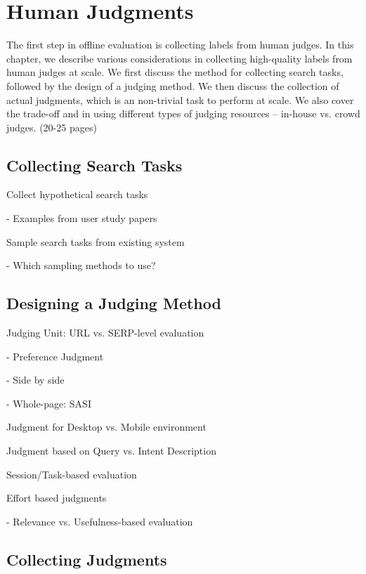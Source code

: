 \documentclass[openany]{now} %
\newcommand{\newpar}{\bigskip\noindent}
\begin{document}
\chapter{Human Judgments}
\label{c-human-judgment}

The first step in offline evaluation is collecting labels from human judges. In this chapter, we describe various considerations in collecting high-quality labels from human judges at scale. We first discuss the method for collecting search tasks, followed by the design of a judging method. We then discuss the collection of actual judgments, which is an non-trivial task to perform at scale. We also cover the trade-off and in using different types of judging resources -- in-house vs. crowd judges. (20-25 pages)

\section{Collecting Search Tasks}

Collect hypothetical search tasks

- Examples from user study papers

\newpar
Sample search tasks from existing system

- Which sampling methods to use? \cite{Baeza-Yates:2015}

\section{Designing a Judging Method}

Judging Unit: URL vs. SERP-level evaluation

- Preference Judgment  \cite{Chandar2013} \cite{CarteretteBCD08}

- Side by side \cite{Thomas2006} \cite{Kim:2013}

- Whole-page: SASI \cite{Bailey2010} 

\newpar
Judgment for Desktop vs. Mobile environment \cite{Verma:2016:CRMD}

\newpar
Judgment based on Query vs. Intent Description \cite{Yilmaz:2014:EID}

\newpar
Session/Task-based evaluation \cite{Moraveji:2011} \cite{Xu:2009}

\newpar
Effort based judgments \cite{Yilmaz:2014} \cite{Verma:2016:EBJ}

- Relevance vs. Usefulness-based evaluation 

\section{Collecting Judgments}
\end{document}
